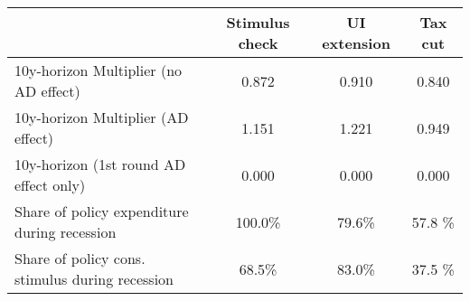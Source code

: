 \begin{tabular}{@{}lccc@{}} 
\toprule 
& Stimulus check    & UI extension    & Tax cut     \\  \midrule 
10y-horizon Multiplier (no AD effect) &0.872  & 0.910  & 0.840     \\ 
10y-horizon Multiplier (AD effect) &1.151  & 1.221  & 0.949     \\ 
10y-horizon (1st round AD effect only) &0.000  & 0.000  & 0.000     \\ 
Share of policy expenditure during recession &100.0\%  & 79.6\%  & 57.8 \%    \\ 
Share of policy cons. stimulus during recession &68.5\%  & 83.0\%  & 37.5 \%    \\ \bottomrule 
\end{tabular}  
